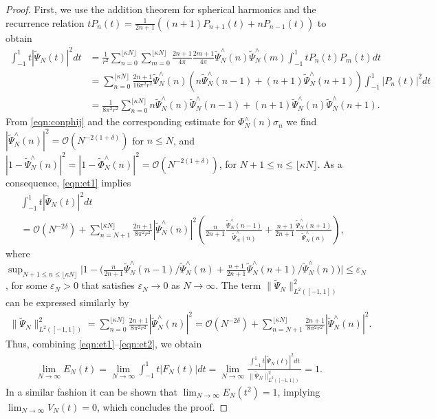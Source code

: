 \documentclass[a4paper, 10pt]{article}
\numberwithin{equation}{section}
\theoremstyle{definition}
\begin{document}
\begin{proof}
First, we use the addition theorem for spherical harmonics and the recurrence relation  $tP_n(t)=\frac{1}{2n+1}\left((n+1)P_{n+1}(t)+nP_{n-1}(t)\right)$ to obtain  
\begin{align}\label{eqn:et1}
\int_{-1}^1 t|\tilde{\Psi}_N(t)|^2 dt&= \frac{1}{r^2} \sum_{n=0}^{\lfloor\kappa N\rfloor}\sum_{m=0}^{\lfloor\kappa N\rfloor}\frac{2n+1}{4\pi}\frac{2m+1}{4\pi}\tilde{\Psi}_N^\wedge(n)\tilde{\Psi}_N^\wedge(m)\int_{-1}^1tP_n(t)P_m(t)dt
\\&=\sum_{n=0}^{\lfloor\kappa N\rfloor}\frac{2n+1}{16\pi^2r^2}\tilde{\Psi}_N^\wedge(n)\left(n\tilde{\Psi}_N^\wedge(n-1)+(n+1)\tilde{\Psi}_N^\wedge(n+1)\right)\int_{-1}^1|P_n(t)|^2 dt\nonumber
\\&=\frac{1}{8\pi^2r^2}\sum_{n=0}^{\lfloor\kappa N\rfloor}n\tilde{\Psi}_N^\wedge(n)\tilde{\Psi}_N^\wedge(n-1)+(n+1)\tilde{\Psi}_N^\wedge(n)\tilde{\Psi}_N^\wedge(n+1).\nonumber
\end{align}
From \eqref{eqn:conphij} and the corresponding estimate for $\Phi_N^\wedge(n)\sigma_n$ we find $|\tilde{\Psi}_N^\wedge(n)|^2=\mathcal{O}(N^{-2(1+\delta)})$ for $n\leq N$, and $|1-\tilde{\Psi}_N^\wedge(n)|^2=|1-\tilde{\Phi}_{N}^\wedge(n)|^2=\mathcal{O}(N^{-2(1+\delta)})$, for $N+1\leq n\leq \lfloor\kappa N\rfloor$. As a consequence,  \eqref{eqn:et1} implies
\begin{align}\label{eqn:et11}
&\int_{-1}^1 t|\tilde{\Psi}_N(t)|^2 dt
\\&=\mathcal{O}(N^{-2\delta})+\sum_{n=N+1}^{\lfloor\kappa N\rfloor} \frac{2n+1}{8\pi^2r^2}|\tilde{\Psi}_N^\wedge(n)|^2\left(\frac{n}{2n+1}\frac{\tilde{\Psi}_N^\wedge(n-1)}{\tilde{\Psi}_N^\wedge(n)}+\frac{n+1}{2n+1}\frac{\tilde{\Psi}_N^\wedge(n+1)}{\tilde{\Psi}_N^\wedge(n)}\right),\nonumber
\end{align}
where $\sup_{N+1\leq n\leq\lfloor \kappa N\rfloor}\big|1-\big(\frac{n}{2n+1}{\tilde{\Psi}_N^\wedge(n-1)}/{\tilde{\Psi}_N^\wedge(n)}+\frac{n+1}{2n+1}{\tilde{\Psi}_N^\wedge(n+1)}/{\tilde{\Psi}_N^\wedge(n)}\big)\big|\leq\varepsilon_N$, for  some $\varepsilon_N>0$ that satisfies $\varepsilon_N\to0$ as $N\to\infty$. The term $\|\tilde{\Psi}_N\|_{L^2([-1,1])}^2$ can be expressed similarly by
\begin{align}\label{eqn:et2}
\|\tilde{\Psi}_N\|_{L^2([-1,1])}^2=\sum_{n=0}^{\lfloor\kappa N\rfloor} \frac{2n+1}{8\pi^2r^2}|\tilde{\Psi}_N^\wedge(n)|^2=\mathcal{O}(N^{-2\delta})+\sum_{n=N+1}^{\lfloor\kappa N\rfloor} \frac{2n+1}{8\pi^2r^2}|\tilde{\Psi}_N^\wedge(n)|^2.
\end{align}
Thus, combining \eqref{eqn:et1}--\eqref{eqn:et2}, we obtain
\begin{align}
\lim_{N\to\infty}E_N(t)=\lim_{N\to\infty}\int_{-1}^1 t|F_N(t)| dt=\lim_{N\to\infty}\frac{\int_{-1}^1 t|\tilde{\Psi}_N(t)|^2 dt}{\|\tilde{\Psi}_N\|_{L^2([-1,1])}^2}=1.
\end{align}
In a similar fashion it can be shown that $\lim_{N\to\infty}E_N(t^2)=1$, implying $\lim_{N\to\infty}V_N(t)=0$, which concludes the proof.
\end{proof}
\end{document}
